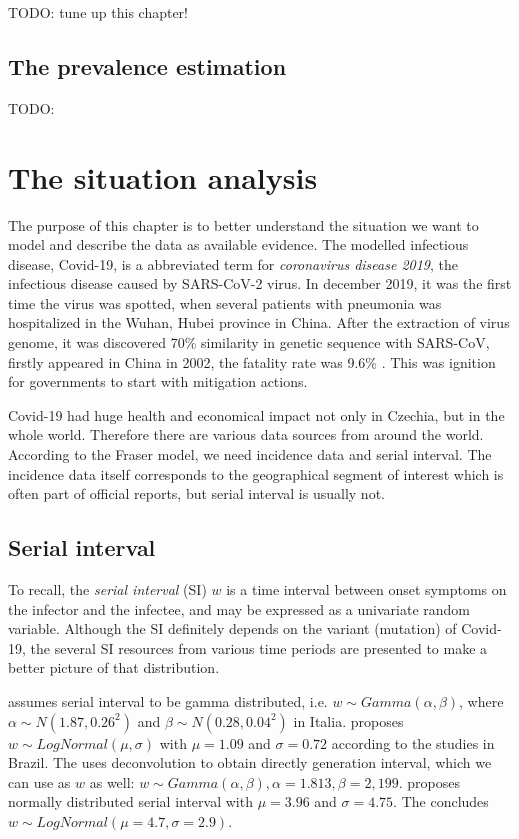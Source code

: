 \documentclass[
  digital, %
  oneside, %
  lof,     %
  lot,     %
]{fithesis4}
\begin{document}
TODO: tune up this chapter!

\section{The prevalence estimation}

TODO:



\chapter{The situation analysis}

The purpose of this chapter is to better understand the situation 
we want to model and describe the data as available evidence. 
The modelled infectious disease, Covid-19, is a abbreviated 
term for \textit{coronavirus disease 2019}, the infectious disease 
caused by SARS-CoV-2 virus. 
In december 2019, it was the first time the virus was spotted, 
when several patients with pneumonia was hospitalized in the 
Wuhan, Hubei province in China. 
After the extraction of virus genome, it was discovered 
70\% similarity in genetic sequence with SARS-CoV, 
firstly appeared in China in 2002, the fatality rate 
was 9.6\% \cite{hui2019}.
This was ignition for governments to start with mitigation 
actions.

Covid-19 had huge health and economical impact not only in 
Czechia, but in the whole world. 
Therefore there are various data sources from around the world. 
According to the Fraser model, we need incidence data and 
serial interval.
The incidence data itself corresponds to the geographical 
segment of interest which is often part of official reports, 
but serial interval is usually not.


\section{Serial interval}

To recall, the \textit{serial interval} (SI) $w$ is a time 
interval between onset symptoms on the infector and the 
infectee, and may be expressed as a univariate random variable. 
Although the SI definitely depends on the variant (mutation) of 
Covid-19, the several SI resources from various time periods are 
presented to make a better picture of that distribution.

\cite{simone2020} assumes serial interval to be gamma 
distributed, i.e. $w \sim Gamma(\alpha,\beta)$, where 
$\alpha \sim N \left( 1.87, 0.26^2 \right)$ and 
$\beta \sim N \left( 0.28, 0.04^2 \right)$ in Italia. 
\cite{prete2020} proposes $w \sim LogNormal(\mu, \sigma)$ 
with $\mu = 1.09$ and $\sigma = 0.72$ according to the 
studies in Brazil. The \cite{knight2020} uses deconvolution 
to obtain directly generation interval, which we can use 
as $w$ as well: $w \sim Gamma(\alpha, \beta), \alpha = 1.813, \beta = 2,199$.
\cite{du2020} proposes normally distributed serial 
interval with $\mu = 3.96$ and $\sigma = 4.75$. 
The \cite{nishiura2020} concludes 
$w \sim LogNormal \left( \mu = 4.7, \sigma = 2.9 \right)$.
\end{document}
